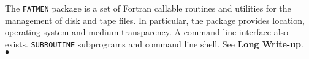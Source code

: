                     
                  
\Submitter{}                
The {\tt FATMEN} package is a set of Fortran callable routines and
utilities for the management of disk and tape files. In particular,
the package provides location, operating system and medium transparency.
A command line interface also exists.
\Structure
{\tt SUBROUTINE} subprograms and command line shell.
\Usage
See {\bf Long Write-up}.
\\ $\bullet$
